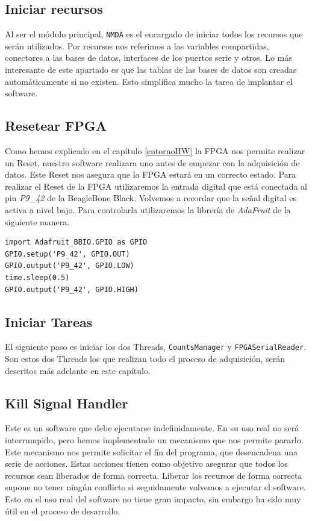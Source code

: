	\subsection{Iniciar recursos}
		Al ser el módulo principal, \texttt{NMDA} es el encargado de iniciar todos los recursos que serán utilizados. Por recursos nos
		referimos a las variables compartidas, conectores a las bases de datos, interfaces de los puertos serie y otros. Lo más interesante de
		este apartado es que las tablas de las bases de datos son creadas automáticamente si no existen. Esto simplifica mucho la tarea de
		implantar el software.
	\subsection{Resetear FPGA}
		Como hemos explicado en el capítulo \ref{entornoHW} la FPGA nos permite realizar un Reset, nuestro software realizara uno antes de
		empezar con la adquisición de datos. Este Reset nos asegura que la FPGA estará en un correcto estado. Para realizar el Reset de la
		FPGA utilizaremos la entrada digital que está conectada al pin \emph{P9\_42} de la BeagleBone Black. Volvemos a recordar que la señal
		digital es activa a nivel bajo. Para controlarla utilizaremos la librería de \emph{AdaFruit}\cite{AdaFruitGit} de la siguiente manera.
		\begin{lstlisting}[style=myPython]
import Adafruit_BBIO.GPIO as GPIO
GPIO.setup('P9_42', GPIO.OUT)
GPIO.output('P9_42', GPIO.LOW)
time.sleep(0.5)
GPIO.output('P9_42', GPIO.HIGH)
		\end{lstlisting}
	\subsection{Iniciar Tareas}
		El siguiente paso es iniciar los dos Threads, \texttt{CountsManager} y \texttt{FPGASerialReader}. Son estos dos Threads los que
		realizan todo el proceso de adquisición, serán descritos más adelante en este capítulo. 
	\subsection{Kill Signal Handler}
		Este es un software que debe ejecutarse indefinidamente. En su uso real no será interrumpido, pero hemos implementado un mecanismo que
		nos permite pararlo. Este mecanismo nos permite solicitar el fin del programa, que desencadena una serie de acciones. Estas acciones
		tienen como objetivo asegurar que todos los recursos sean liberados de forma correcta. Liberar los recursos de forma correcta supone
		no tener ningún conflicto si seguidamente volvemos a ejecutar el software. Esto en el uso real del software no tiene gran impacto, sin
		embargo ha sido muy útil en el proceso de desarrollo.

